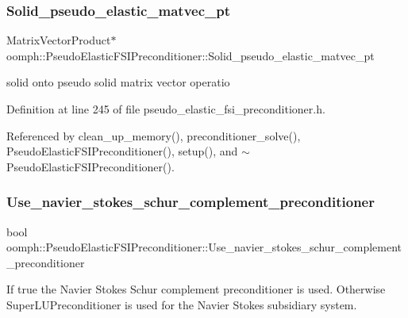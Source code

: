 \subsubsection{\texorpdfstring{Solid\+\_\+pseudo\+\_\+elastic\+\_\+matvec\+\_\+pt}{Solid\_pseudo\_elastic\_matvec\_pt}}
{\footnotesize\ttfamily Matrix\+Vector\+Product$\ast$ oomph\+::\+Pseudo\+Elastic\+F\+S\+I\+Preconditioner\+::\+Solid\+\_\+pseudo\+\_\+elastic\+\_\+matvec\+\_\+pt\hspace{0.3cm}{\ttfamily [private]}}



solid onto pseudo solid matrix vector operatio 



Definition at line 245 of file pseudo\+\_\+elastic\+\_\+fsi\+\_\+preconditioner.\+h.



Referenced by clean\+\_\+up\+\_\+memory(), preconditioner\+\_\+solve(), Pseudo\+Elastic\+F\+S\+I\+Preconditioner(), setup(), and $\sim$\+Pseudo\+Elastic\+F\+S\+I\+Preconditioner().

\mbox{\label{classoomph_1_1PseudoElasticFSIPreconditioner_aa9eab77e9d4dfbdecfac9cccceb68c7b}} 
\subsubsection{\texorpdfstring{Use\+\_\+navier\+\_\+stokes\+\_\+schur\+\_\+complement\+\_\+preconditioner}{Use\_navier\_stokes\_schur\_complement\_preconditioner}}
{\footnotesize\ttfamily bool oomph\+::\+Pseudo\+Elastic\+F\+S\+I\+Preconditioner\+::\+Use\+\_\+navier\+\_\+stokes\+\_\+schur\+\_\+complement\+\_\+preconditioner\hspace{0.3cm}{\ttfamily [private]}}



If true the Navier Stokes Schur complement preconditioner is used. Otherwise Super\+L\+U\+Preconditioner is used for the Navier Stokes subsidiary system. 



